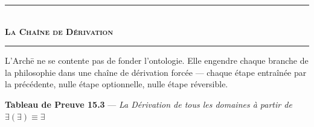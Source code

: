 \documentclass[10pt, openany, oneside]{book}
\renewcommand{\normalsize}{\fontsize{10}{13}\selectfont}
\begin{document}
\begin{center}
    \rule{0.3\textwidth}{0.4pt}\\[0.5em]
    {\normalsize\bfseries\scshape La Chaîne de Dérivation}\\[0.3em]
    \rule{0.3\textwidth}{0.4pt}
\end{center}

\vspace{0.5em}

\noindent L'Arch\={e} ne se contente pas de fonder l'ontologie. Elle engendre chaque branche de la philosophie dans une chaîne de dérivation forcée --- chaque étape entraînée par la précédente, nulle étape optionnelle, nulle étape réversible.

\vspace{0.3em}

\textbf{Tableau de Preuve 15.3} --- \textit{La Dérivation de tous les domaines à partir de} $\exists(\exists) \equiv \exists$

\vspace{0.5em}
\end{document}
